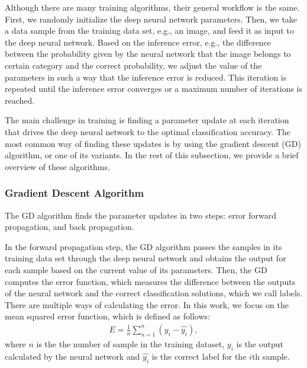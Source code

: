 \documentclass[conference]{IEEEtran}
\begin{document}
Although there are many training algorithms, their general workflow is the same. 
First, we randomly initialize the deep neural network parameters.
Then, we take a data sample from the training data set, e.g., an image, and feed it as input to the deep neural network. Based on the
inference error, e.g., the difference between the probability given by the neural network that the image belongs to certain category
and the correct probability, we adjust the value of the parameters in such a way that the inference error is reduced. This iteration is
repeated until the inference error converges or a maximum number of iterations is reached. 



The main challenge in training is finding a parameter update at each iteration that drives the deep neural network to the optimal
classification accuracy. The most common way of finding these updates is by using the gradient descent (GD) algorithm, or one of its
variants. In the rest of this subsection, we provide a brief overview of these algorithms. 

\subsubsection{Gradient Descent Algorithm}
The GD algorithm finds the parameter updates in two steps: error  forward propagation, and back propagation. 

In the forward propagation step, the GD algorithm passes the samples in its training data set through the
deep neural network and obtains the output for each sample based on the current value of its parameters. Then, the GD computes the
error function, which measures the difference between the outputs of the neural network and the correct classification solutions,
which we call labels. There are multiple ways of calculating the error. In this work, we focus on the mean squared error function,
which is defined as follows:
\begin{align}\label{eq:errorFunction}
 E= \frac{1}{n} \sum_{n=1}^{n}(y_i -\hat{y_i}),
\end{align}
where $n$ is the the number of sample in the training dataset, $y_i$ is the output calculated by the neural network and 
$\hat{y_i}$ is the correct label for the $i$th sample.
\end{document}
